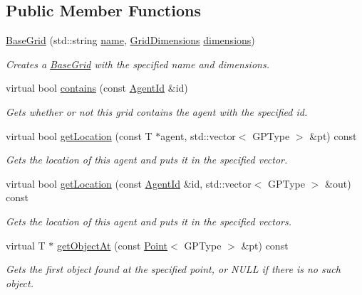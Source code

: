 \subsection*{Public Member Functions}
\begin{DoxyCompactItemize}
\item 
\hyperlink{classrepast_1_1_base_grid_a73eae15ca682e2c03a71392c29453d43}{Base\-Grid} (std\-::string \hyperlink{classrepast_1_1_projection_ab60a0ab4f584685780307d7431b61800}{name}, \hyperlink{classrepast_1_1_grid_dimensions}{Grid\-Dimensions} \hyperlink{classrepast_1_1_base_grid_a5f8a2fc16b8aeba026a58fcb374cf05c}{dimensions})
\begin{DoxyCompactList}\small\item\em Creates a \hyperlink{classrepast_1_1_base_grid}{Base\-Grid} with the specified name and dimensions. \end{DoxyCompactList}\item 
virtual bool \hyperlink{classrepast_1_1_base_grid_a648fcba07fdc15b4072b5807b4f1b6b0}{contains} (const \hyperlink{classrepast_1_1_agent_id}{Agent\-Id} \&id)
\begin{DoxyCompactList}\small\item\em Gets whether or not this grid contains the agent with the specified id. \end{DoxyCompactList}\item 
virtual bool \hyperlink{classrepast_1_1_base_grid_a9ef8aae56bb771fa152b10408d718f6e}{get\-Location} (const T $\ast$agent, std\-::vector$<$ G\-P\-Type $>$ \&pt) const 
\begin{DoxyCompactList}\small\item\em Gets the location of this agent and puts it in the specified vector. \end{DoxyCompactList}\item 
virtual bool \hyperlink{classrepast_1_1_base_grid_aa18b424b73ff46fde970ad1e1bb3cdc4}{get\-Location} (const \hyperlink{classrepast_1_1_agent_id}{Agent\-Id} \&id, std\-::vector$<$ G\-P\-Type $>$ \&out) const 
\begin{DoxyCompactList}\small\item\em Gets the location of this agent and puts it in the specified vectors. \end{DoxyCompactList}\item 
virtual T $\ast$ \hyperlink{classrepast_1_1_base_grid_a3710f4aca96eeb3a95a44fe80e0c998a}{get\-Object\-At} (const \hyperlink{classrepast_1_1_point}{Point}$<$ G\-P\-Type $>$ \&pt) const 
\begin{DoxyCompactList}\small\item\em Gets the first object found at the specified point, or N\-U\-L\-L if there is no such object. \end{DoxyCompactList}\item 

\end{DoxyCompactItemize}
